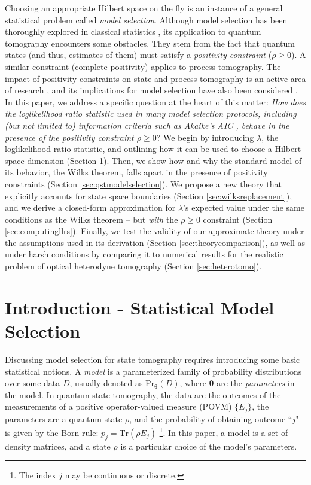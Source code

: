 \documentclass[aps,pra, twocolumn]{revtex4-1}
\newcommand{\bs}[1]{\boldsymbol{#1}}
\begin{document}
Choosing an appropriate Hilbert space on the fly is an instance of a general statistical problem called \emph{model selection}.  Although model selection has been thoroughly explored in classical statistics \cite{Burnham2004}, its application to quantum tomography encounters some obstacles.  They stem from the fact that quantum states (and thus, estimates of them) must satisfy a \emph{positivity constraint} ($\rho\geq0$).  A similar constraint (complete positivity) applies to process tomography.  The impact of positivity constraints on state and process tomography is an active area of research \cite{Candes2006, Flammia2012a, Suess2016, Carpentier2015}, and its implications for model selection have also been considered \cite{Schwarz2013a, Guta2012a, VanEnk2013a, Langford2013, Yin2011, Moroder2013, Knips2015}.  In this paper, we address a specific question at the heart of this matter:  \emph{How does the loglikelihood ratio statistic used in many model selection protocols, including (but not limited to) information criteria such as Akaike's AIC \cite{Akaike1974}, behave in the presence of the positivity constraint $\rho\geq0$}?  We begin by introducing $\lambda$, the loglikelihood ratio statistic, and outlining how it can be used to choose a Hilbert space dimension (Section \ref{sec:intro}).  Then, we show how and why the standard model of its behavior, the Wilks theorem, falls apart in the presence of positivity constraints (Section \ref{sec:qstmodelselection}).  We propose a new theory that explicitly accounts for state space boundaries (Section \ref{sec:wilksreplacement}), and we derive a closed-form approximation for $\lambda$'s expected value under the same conditions as the Wilks theorem -- but \emph{with} the $\rho\geq0$ constraint (Section \ref{sec:computingllrs}).  Finally, we test the validity of our approximate theory under the assumptions used in its derivation (Section \ref{sec:theorycomparison}), as well as under harsh conditions by comparing it to numerical results for the realistic problem of optical heterodyne tomography (Section \ref{sec:heterotomo}).

\section{Introduction - Statistical Model Selection}
\label{sec:intro}
Discussing model selection for state tomography requires introducing some basic statistical notions.  A \emph{model} is a parameterized family of probability distributions over some data $D$, usually denoted as $\mathrm{Pr}_{\bs{\theta}}(D)$, where $\bs{\theta}$ are the \emph{parameters} in the model. In quantum state tomography, the data are the outcomes of the measurements of a positive operator-valued measure (POVM) $\{E_{j}\}$, the parameters are a quantum state $\rho$, and the probability of obtaining outcome ``$j$" is given by the Born rule: $p_{j} = \mathrm{Tr}(\rho E_{j})$ \footnote{The index $j$ may be continuous or discrete.}. In this paper, a model is a set of density matrices, and a state $\rho$ is a particular choice of the model's parameters.
\end{document}
